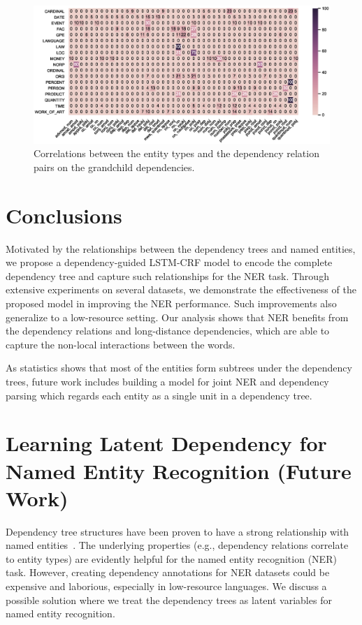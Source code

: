 \begin{figure}[h!]
	\centering
	\includegraphics[width=6.2in]{Figures/gdrelana.eps}
	\caption{Correlations between the entity types and the dependency relation pairs on the grandchild dependencies.}
	\label{fig:gd}
\end{figure}

\section{Conclusions}
Motivated by the relationships between the dependency trees and named entities, we propose a dependency-guided LSTM-CRF model to encode the complete dependency tree and capture such relationships for the NER task. 
Through extensive experiments on several datasets, we demonstrate the effectiveness of the proposed model in improving the NER performance. 
Such improvements also generalize to a low-resource setting. 
Our analysis shows that NER benefits from the dependency relations and long-distance dependencies, which are able to capture the non-local interactions between the words. 

As statistics shows that most of the entities form subtrees under the dependency trees, future work includes building a model for joint NER and dependency parsing which regards each entity as a single unit in a dependency tree. 


\section{Learning Latent Dependency for Named Entity Recognition (Future Work)}
Dependency tree structures have been proven to have a strong relationship with named entities~\cite{jie2019dependency}. 
The underlying properties (e.g., dependency relations correlate to entity types) are evidently helpful for the named entity recognition (NER) task.
However, creating dependency annotations for NER datasets could be expensive and laborious, especially in low-resource languages.
We discuss a possible solution where we treat the dependency trees as latent variables for named entity recognition.

